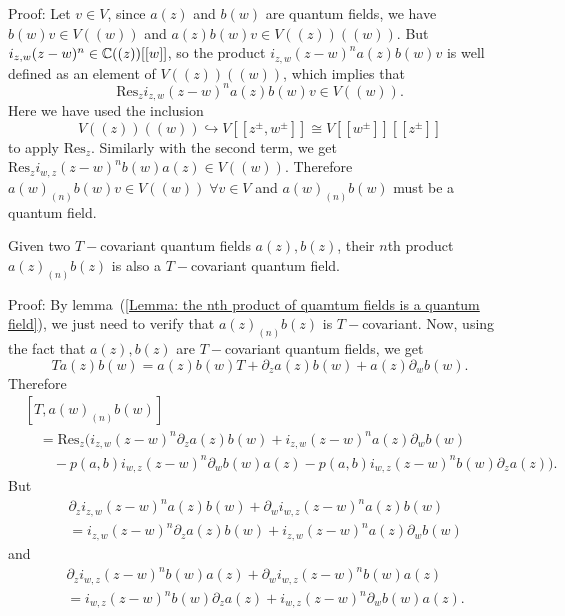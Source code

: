 Proof: Let $v\in V$, since $a(z)$ and $b(w)$ are quantum fields, we have $b(w)v\in V((w))$ and $a(z)b(w)v\in V((z))((w))$. But $i_{z,w}(z-w)^n\in \mathbb{C}((z))[[w]]$, so the product $i_{z,w}(z-w)^na(z)b(w)v$ is well defined as an element of $V((z))((w))$, which implies that
\[
\text{Res}_zi_{z,w}(z-w)^na(z)b(w)v \in V((w)).
\]
Here we have used the inclusion
\[V((z))((w))\hookrightarrow V[[z^\pm,w^\pm]]\cong V[[w^\pm]][[z^\pm]]\]
 to apply $\text{Res}_z$. Similarly with the second term, we get $\text{Res}_zi_{w,z}(z-w)^nb(w)a(z)\in V((w))$. Therefore $a(w)_{(n)}b(w)v\in V((w))\;\forall v\in V$ and $a(w)_{(n)}b(w)$ must be a quantum field. 
\begin{dang}
    \begin{lemma}\label{Lemma: nth products of T-covariants is T-covariant}\cite{de2006finite}
        Given two $T-$covariant quantum fields $a(z), b(z)$, their $n$th product $a(z)_{(n)}b(z)$ is also a $T-$covariant quantum field.
    \end{lemma}
\end{dang}
Proof: By lemma~(\ref{Lemma: the nth product of quamtum fields is a quantum field}), we just need to verify that $a(z)_{(n)}b(z)$ is $T-$covariant. Now, using the fact that $a(z), b(z)$ are $T-$covariant quantum fields, we get
\begin{equation}
    Ta(z)b(w) = a(z)b(w)T+\partial_za(z)b(w) + a(z)\partial_wb(w).
\end{equation}
Therefore
\begin{equation}
\begin{split}
    &[T,a(w)_{(n)}b(w)] \\
    &\quad= \text{Res}_z( i_{z,w}(z-w)^n\partial_za(z)b(w) + i_{z,w}(z-w)^na(z)\partial_wb(w)\\
    &\quad\quad-p(a,b)i_{w,z}(z-w)^n\partial_wb(w)a(z)-p(a,b)i_{w,z}(z-w)^nb(w)\partial_za(z)).
\end{split}
\end{equation}
But 
\begin{equation}
\begin{split}
     &\partial_zi_{z,w}(z-w)^na(z)b(w) + \partial_wi_{w,z}(z-w)^na(z)b(w)\\
     &= i_{z,w}(z-w)^n\partial_za(z)b(w) + i_{z,w}(z-w)^na(z)\partial_wb(w)
\end{split}
\end{equation}
and
\begin{equation}
\begin{split}
    &\partial_zi_{w,z}(z-w)^nb(w)a(z) + \partial_wi_{w,z}(z-w)^nb(w)a(z)\\
    &=i_{w,z}(z-w)^nb(w)\partial_za(z) + i_{w,z}(z-w)^n\partial_wb(w)a(z).
\end{split} 
\end{equation}
